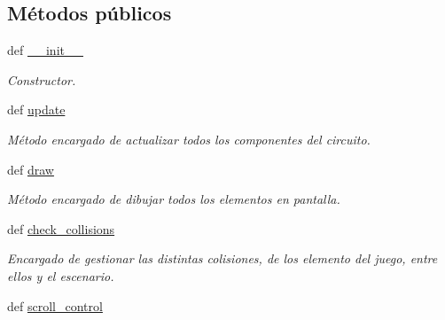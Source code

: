 \subsection*{\-Métodos públicos}
\begin{DoxyCompactItemize}
\item 
def \hyperlink{classengine_1_1gamecontrol_1_1GameControl_ae8cc2a551c798ba23c5c4dba8558f802}{\-\_\-\-\_\-init\-\_\-\-\_\-}
\begin{DoxyCompactList}\small\item\em \-Constructor. \end{DoxyCompactList}\item 
\hypertarget{classengine_1_1gamecontrol_1_1GameControl_a00a70a7c19d5b19d7103b2d7b23e94c7}{
def \hyperlink{classengine_1_1gamecontrol_1_1GameControl_a00a70a7c19d5b19d7103b2d7b23e94c7}{update}}
\label{classengine_1_1gamecontrol_1_1GameControl_a00a70a7c19d5b19d7103b2d7b23e94c7}

\begin{DoxyCompactList}\small\item\em \-Método encargado de actualizar todos los componentes del circuito. \end{DoxyCompactList}\item 
def \hyperlink{classengine_1_1gamecontrol_1_1GameControl_a137905fbe1021930896898dc603a108a}{draw}
\begin{DoxyCompactList}\small\item\em \-Método encargado de dibujar todos los elementos en pantalla. \end{DoxyCompactList}\item 
\hypertarget{classengine_1_1gamecontrol_1_1GameControl_ab67eeeeb97077bdaf2f4e964af3acfb7}{
def \hyperlink{classengine_1_1gamecontrol_1_1GameControl_ab67eeeeb97077bdaf2f4e964af3acfb7}{check\-\_\-collisions}}
\label{classengine_1_1gamecontrol_1_1GameControl_ab67eeeeb97077bdaf2f4e964af3acfb7}

\begin{DoxyCompactList}\small\item\em \-Encargado de gestionar las distintas colisiones, de los elemento del juego, entre ellos y el escenario. \end{DoxyCompactList}\item 
\hypertarget{classengine_1_1gamecontrol_1_1GameControl_af717dfd4c17165e6632f33bc0e1214da}{
def \hyperlink{classengine_1_1gamecontrol_1_1GameControl_af717dfd4c17165e6632f33bc0e1214da}{scroll\-\_\-control}}
\label{classengine_1_1gamecontrol_1_1GameControl_af717dfd4c17165e6632f33bc0e1214da}


\end{DoxyCompactItemize}
